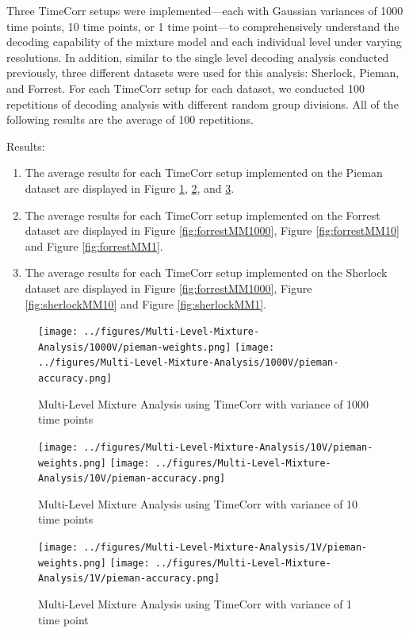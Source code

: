 \documentclass[11pt]{article}
\begin{document}
Three TimeCorr setups were implemented---each with Gaussian variances of 1000 time points, 10 time points, or 1 time point---to comprehensively understand the decoding capability of the mixture model and each individual level under varying resolutions. In addition, similar to the single level decoding analysis conducted previously, three different datasets were used for this analysis: Sherlock, Pieman, and Forrest. For each TimeCorr setup for each dataset, we conducted 100 repetitions of decoding analysis with different random group divisions. All of the following results are the average of 100 repetitions.

Results:
\begin{enumerate}
\item The average results for each TimeCorr setup implemented on the Pieman dataset are displayed in Figure \ref{fig:piemanMM1000}, \ref{fig:piemanMM10}, and \ref{fig:piemanMM1}.
\item The average results for each TimeCorr setup implemented on the Forrest dataset are displayed in Figure \ref{fig:forrestMM1000}, Figure \ref{fig:forrestMM10} and Figure \ref{fig:forrestMM1}.
\item The average results for each TimeCorr setup implemented on the Sherlock dataset are displayed in Figure \ref{fig:forrestMM1000}, Figure \ref{fig:sherlockMM10} and Figure \ref{fig:sherlockMM1}.
\end{enumerate}

\begin{figure}[!htb]
\caption{Multi-Level Mixture Analysis using TimeCorr with variance of 1000 time points}
\centering
\texttt{[image: ../figures/Multi-Level-Mixture-Analysis/1000V/pieman-weights.png]}
\texttt{[image: ../figures/Multi-Level-Mixture-Analysis/1000V/pieman-accuracy.png]}
\label{fig:piemanMM1000}
\end{figure}

\begin{figure}[!htb]
\caption{Multi-Level Mixture Analysis using TimeCorr with variance of 10 time points}
\centering
\texttt{[image: ../figures/Multi-Level-Mixture-Analysis/10V/pieman-weights.png]}
\texttt{[image: ../figures/Multi-Level-Mixture-Analysis/10V/pieman-accuracy.png]}
\label{fig:piemanMM10}
\end{figure}

\begin{figure}[!htb]
\caption{Multi-Level Mixture Analysis using TimeCorr with variance of 1 time point}
\centering
\texttt{[image: ../figures/Multi-Level-Mixture-Analysis/1V/pieman-weights.png]}
\texttt{[image: ../figures/Multi-Level-Mixture-Analysis/1V/pieman-accuracy.png]}
\label{fig:piemanMM1}
\end{figure}
\end{document}
